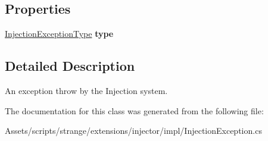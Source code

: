 \subsection*{Properties}
\begin{DoxyCompactItemize}
\item 
\hypertarget{classstrange_1_1extensions_1_1injector_1_1impl_1_1_injection_exception_a30971ecda24e1af5e691b05db615f91e}{\hyperlink{namespacestrange_1_1extensions_1_1injector_1_1api_a465caee64cba80e952ad7dd9a050e6c3}{Injection\-Exception\-Type} {\bfseries type}}\label{classstrange_1_1extensions_1_1injector_1_1impl_1_1_injection_exception_a30971ecda24e1af5e691b05db615f91e}

\end{DoxyCompactItemize}


\subsection{Detailed Description}
An exception throw by the Injection system. 

The documentation for this class was generated from the following file\-:\begin{DoxyCompactItemize}
\item 
Assets/scripts/strange/extensions/injector/impl/Injection\-Exception.\-cs\end{DoxyCompactItemize}
